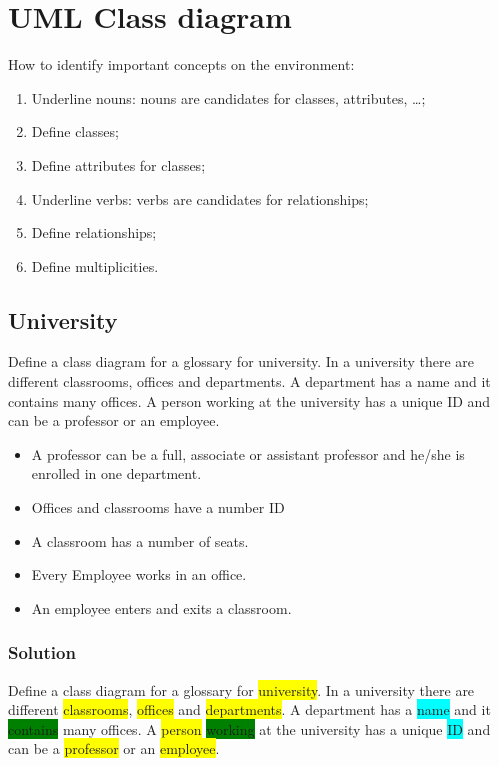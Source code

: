 \chapter{UML Class diagram}
How to identify important concepts on the environment:
\begin{enumerate}
\item Underline nouns: nouns are candidates for classes, attributes, \dots;
\item Define classes;
\item Define attributes for classes;
\item Underline verbs: verbs are candidates for relationships;
\item Define relationships;
\item Define multiplicities.
\end{enumerate}

\section{University}
Define a class diagram for a glossary for university. In a university there are different classrooms, offices and departments. A department has a name and it contains many offices. A person working at the university has a unique ID and can be a professor or an employee.

\begin{itemize}
\item A professor can be a full, associate or assistant professor and he/she is enrolled in one department.
\item Offices and classrooms have a number ID
\item A classroom has a number of seats.
\item Every Employee works in an office.
\item An employee enters and exits a classroom.
\end{itemize}

\subsection{Solution}
Define a class diagram for a glossary for \colorbox{yellow}{university}. In a university there are different \colorbox{yellow}{classrooms}, \colorbox{yellow}{offices} and \colorbox{yellow}{departments}. A department has a \colorbox{cyan}{name} and it \colorbox{green}{contains} many offices. A \colorbox{yellow}{person} \colorbox{green}{working} at the university has a unique \colorbox{cyan}{ID} and can be a \colorbox{yellow}{professor} or an \colorbox{yellow}{employee}.

